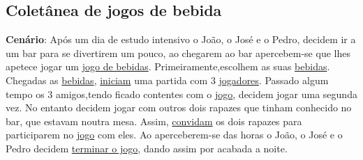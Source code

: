 \documentclass{article}
\begin{document}
\subsection*{Coletânea de jogos de bebida}
\textbf{Cenário}: Após um dia de estudo intensivo o João, o José e o Pedro, decidem ir a um bar para se divertirem um pouco, ao chegarem ao bar apercebem-se que lhes apetece jogar um \underline{jogo de bebidas}. Primeiramente,escolhem as suas \underline{bebidas}. Chegadas as \underline{bebidas}, \underline{iniciam} uma partida com 3 \underline{jogadores}. 
Passado algum tempo os 3 amigos,tendo ficado contentes com o \underline{jogo}, decidem jogar uma segunda vez. No entanto decidem jogar com outros dois rapazes que tinham conhecido no bar, que estavam noutra mesa. Assim, \underline{convidam} os dois rapazes para participarem no \underline{jogo} com eles. Ao aperceberem-se das horas o João, o José e o Pedro decidem \underline{terminar o jogo}, dando assim por acabada a noite.
\end{document}
